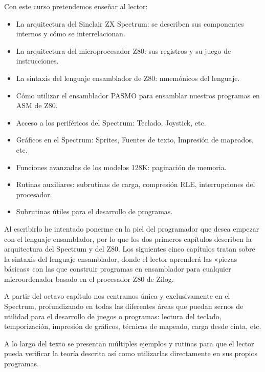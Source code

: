\documentclass[letterpaper,10pt,spanish]{sphinxmanual}
\begin{document}
Con este curso pretendemos enseñar al lector:
\begin{itemize}
\item {} 
La arquitectura del Sinclair ZX Spectrum: se describen sus componentes internos y cómo se interrelacionan.

\item {} 
La arquitectura del microprocesador Z80: sus registros y su juego de instrucciones.

\item {} 
La sintaxis del lenguaje ensamblador de Z80: nmemónicos del lenguaje.

\item {} 
Cómo utilizar el ensamblador PASMO para ensamblar nuestros programas en ASM de Z80.

\item {} 
Acceso a los periféricos del Spectrum: Teclado, Joystick, etc.

\item {} 
Gráficos en el Spectrum: Sprites, Fuentes de texto, Impresión de mapeados, etc.

\item {} 
Funciones avanzadas de los modelos 128K: paginación de memoria.

\item {} 
Rutinas auxiliares: subrutinas de carga, compresión RLE, interrupciones del procesador.

\item {} 
Subrutinas útiles para el desarrollo de programas.

\end{itemize}

Al escribirlo he intentado ponerme en la piel del programador que desea empezar con el lenguaje ensamblador, por lo que los dos primeros capítulos describen la arquitectura del Spectrum y del Z80. Los siguientes cinco capítulos tratan sobre la sintaxis del lenguaje ensamblador, donde el lector aprenderá las «piezas básicas» con las que construir programas en ensamblador para cualquier microordenador basado en el procesador Z80 de Zilog.

A partir del octavo capítulo nos centramos única y exclusivamente en el Spectrum, profundizando en todas las diferentes áreas que puedan sernos de utilidad para el desarrollo de juegos o programas: lectura del teclado, temporización, impresión de gráficos, técnicas de mapeado, carga desde cinta, etc.

A lo largo del texto se presentan múltiples ejemplos y rutinas para que el lector pueda verificar la teoría descrita así como utilizarlas directamente en sus propios programas.
\end{document}
